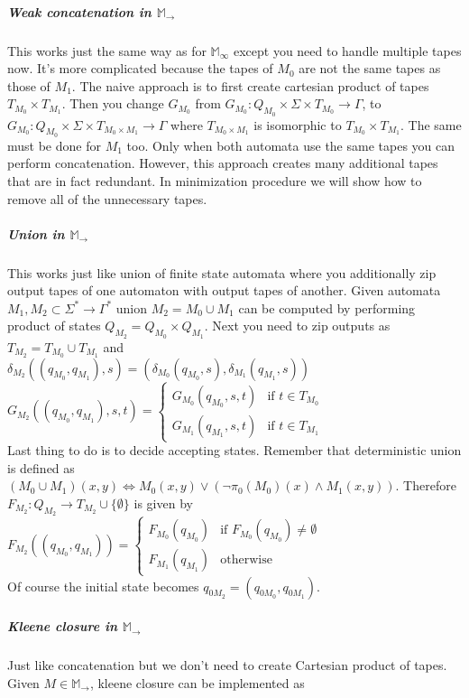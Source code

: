 \documentclass[12pt]{article}
\begin{document}
\subparagraph{Weak concatenation in $\mathbb{M}_\rightarrow$} This works just the same way as for $\mathbb{M}_\infty$ except you need to handle multiple tapes now. It's more complicated because the tapes of $M_0$ are not the same tapes as those of $M_1$. The naive approach is to first create cartesian product of tapes $T_{M_0} \times T_{M_1}$. Then you change $G_{M_0}$ from $G_{M_0} : Q_{M_0} \times \Sigma \times T_{M_0} \rightarrow \Gamma$, to $G_{M_0} : Q_{M_0} \times \Sigma \times T_{M_0 \times M_1} \rightarrow \Gamma$ where $T_{M_0 \times M_1}$ is isomorphic to $T_{M_0} \times T_{M_1}$. The same must be done for $M_1$ too. Only when both automata use the same tapes you can perform concatenation. However, this approach creates many additional tapes that are in fact redundant. In minimization procedure we  will show how to remove all of the unnecessary tapes.

\subparagraph{Union in $\mathbb{M}_\rightarrow$}  This works just like union of finite state automata where you additionally zip output tapes of one automaton with output tapes of another. Given automata $M_1,M_2 \subset \Sigma^* \rightarrow \Gamma^*$ union $M_2=M_0 \cup M_1$ can be computed by performing product of states $Q_{M_2} = Q_{M_0} \times Q_{M_1}$. Next you need to zip outputs as $T_{M_2} = T_{M_0} \cup T_{M_1}$  and \\
$\delta_{M_2}((q_{M_0},q_{M_1}),s) = 
(\delta_{M_0}(q_{M_0},s),\delta_{M_1}(q_{M_1},s))$ \\
$G_{M_2}((q_{M_0},q_{M_1}),s,t) = \begin{cases}
G_{M_0}(q_{M_0},s,t)  & \mbox{if }  t \in T_{M_0} \\
G_{M_1}(q_{M_1},s,t)  & \mbox{if }  t \in T_{M_1}
\end{cases}$\\
Last thing to do is to decide accepting states. Remember that deterministic union is defined as $(M_0 \cup M_1)(x,y) \iff M_0(x,y) \vee (\neg \pi_0(M_0)(x) \wedge M_1(x,y))$. Therefore $F_{M_2} : Q_{M_2}  \rightarrow T_{M_2} \cup \{\emptyset\}$ is given by \\
$F_{M_2}((q_{M_0},q_{M_1})) = \begin{cases}
F_{M_0}(q_{M_0})  & \mbox{if }  F_{M_0}(q_{M_0}) \ne \emptyset  \\
F_{M_1}(q_{M_1})  & \mbox{otherwise} 
\end{cases} $ \\
Of course the initial state becomes $q_{0M_2}=(q_{0M_0},q_{0M_1})$.

\subparagraph{Kleene closure in $\mathbb{M}_\rightarrow$} Just like concatenation but we don't need to create Cartesian product of tapes. Given $M \in \mathbb{M}_\rightarrow$, kleene closure can be implemented as
\end{document}
